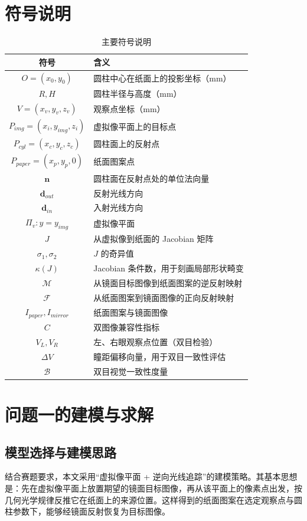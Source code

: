\documentclass[a4paper,12pt]{ctexart}
\begin{document}
\section{符号说明}

\begin{table}[H]
\centering
\caption{主要符号说明}
\begin{tabular}{cl}
\toprule[1.5pt]
\textbf{符号} & \textbf{含义} \\
\midrule[1pt]
$O=(x_0,y_0)$ & 圆柱中心在纸面上的投影坐标（mm） \\
$R,H$ & 圆柱半径与高度（mm） \\
$V=(x_v,y_v,z_v)$ & 观察点坐标（mm） \\
$P_{img}=(x_i,y_{img},z_i)$ & 虚拟像平面上的目标点 \\
$P_{cyl}=(x_c,y_c,z_c)$ & 圆柱面上的反射点 \\
$P_{paper}=(x_p,y_p,0)$ & 纸面图案点 \\
$\mathbf{n}$ & 圆柱面在反射点处的单位法向量 \\
$\mathbf{d}_{out}$ & 反射光线方向 \\
$\mathbf{d}_{in}$ & 入射光线方向 \\
$\Pi_v:y=y_{img}$ & 虚拟像平面 \\
$J$ & 从虚拟像到纸面的 Jacobian 矩阵 \\
$\sigma_1,\sigma_2$ & $J$ 的奇异值 \\
$\kappa(J)$ & Jacobian 条件数，用于刻画局部形状畸变 \\
$\mathcal{M}$ & 从镜面目标图像到纸面图案的逆反射映射 \\
$\mathcal{F}$ & 从纸面图案到镜面图像的正向反射映射 \\
$I_{paper},I_{mirror}$ & 纸面图案与镜面图像 \\
$C$ & 双图像兼容性指标 \\
$V_L,V_R$ & 左、右眼观察点位置（双目检验） \\
$\Delta V$ & 瞳距偏移向量，用于双目一致性评估 \\
$\mathcal{B}$ & 双目视觉一致性度量 \\
\bottomrule[1.5pt]
\end{tabular}
\end{table}

\section{问题一的建模与求解}

\subsection{模型选择与建模思路}
\par 结合赛题要求，本文采用“虚拟像平面 + 逆向光线追踪”的建模策略。其基本思想是：先在虚拟像平面上放置期望的镜面目标图像，再从该平面上的像素点出发，按几何光学规律反推它在纸面上的来源位置。这样得到的纸面图案在选定观察点与圆柱参数下，能够经镜面反射恢复为目标图像。
\end{document}
